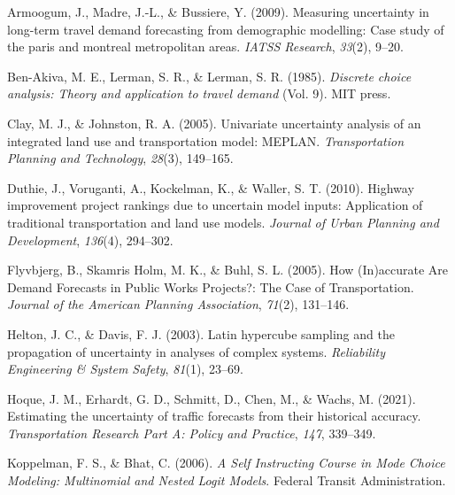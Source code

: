 \documentclass[fancy, masters]{byuthesis}
\newlength{\cslhangindent}
\newlength{\cslentryspacingunit} %
\newenvironment{CSLReferences}[2] %
 {%
  \setlength{\parindent}{0pt}
  \ifodd #1
  \let\oldpar\par
  \def\par{\hangindent=\cslhangindent\oldpar}
  \fi
  \setlength{\parskip}{#2\cslentryspacingunit}
 }%
 {}
\begin{document}
\pagestyle{myrefs}

\hypertarget{refs}{}
\begin{CSLReferences}{1}{0}
\leavevmode{}%
Armoogum, J., Madre, J.-L., \& Bussiere, Y. (2009). Measuring uncertainty in long-term travel demand forecasting from demographic modelling: Case study of the paris and montreal metropolitan areas. \emph{IATSS Research}, \emph{33}(2), 9--20.

\leavevmode{}%
Ben-Akiva, M. E., Lerman, S. R., \& Lerman, S. R. (1985). \emph{Discrete choice analysis: Theory and application to travel demand} (Vol. 9). MIT press.

\leavevmode{}%
Clay, M. J., \& Johnston, R. A. (2005). Univariate uncertainty analysis of an integrated land use and transportation model: MEPLAN. \emph{Transportation Planning and Technology}, \emph{28}(3), 149--165.

\leavevmode{}%
Duthie, J., Voruganti, A., Kockelman, K., \& Waller, S. T. (2010). Highway improvement project rankings due to uncertain model inputs: Application of traditional transportation and land use models. \emph{Journal of Urban Planning and Development}, \emph{136}(4), 294--302.

\leavevmode{}%
Flyvbjerg, B., Skamris Holm, M. K., \& Buhl, S. L. (2005). How ({In})accurate {Are Demand Forecasts} in {Public Works Projects}?: {The Case} of {Transportation}. \emph{Journal of the American Planning Association}, \emph{71}(2), 131--146.

\leavevmode{}%
Helton, J. C., \& Davis, F. J. (2003). Latin hypercube sampling and the propagation of uncertainty in analyses of complex systems. \emph{Reliability Engineering \& System Safety}, \emph{81}(1), 23--69.

\leavevmode{}%
Hoque, J. M., Erhardt, G. D., Schmitt, D., Chen, M., \& Wachs, M. (2021). Estimating the uncertainty of traffic forecasts from their historical accuracy. \emph{Transportation Research Part A: Policy and Practice}, \emph{147}, 339--349.

\leavevmode{}%
Koppelman, F. S., \& Bhat, C. (2006). \emph{A {Self Instructing Course} in {Mode Choice Modeling}: {Multinomial} and {Nested Logit Models}}. {Federal Transit Administration}.


\end{CSLReferences}
\end{document}
